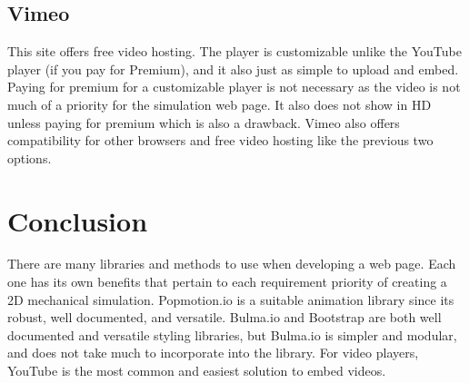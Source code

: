 \documentclass[capstone.tex]{subfiles}
\begin{document}
\subsection{Vimeo}
This site offers free video hosting. The player is customizable unlike the YouTube player (if you pay for Premium), and it also just as simple to upload and embed. Paying for premium for a customizable player is not necessary as the video is not much of a priority for the simulation web page. It also does not show in HD unless paying for premium which is also a drawback. Vimeo also offers compatibility for other browsers and free video hosting like the previous two options\cite{video}. 

\section{Conclusion}
There are many libraries and methods to use when developing a web page. Each one has its own benefits that pertain to each requirement priority of creating a 2D mechanical simulation. Popmotion.io is a suitable animation library since its robust, well documented, and versatile. Bulma.io and Bootstrap are both well documented and versatile styling libraries, but Bulma.io is simpler and modular, and does not take much to incorporate into the library. For video players, YouTube is the most common and easiest solution to embed videos. 

% 
%
\end{document}
